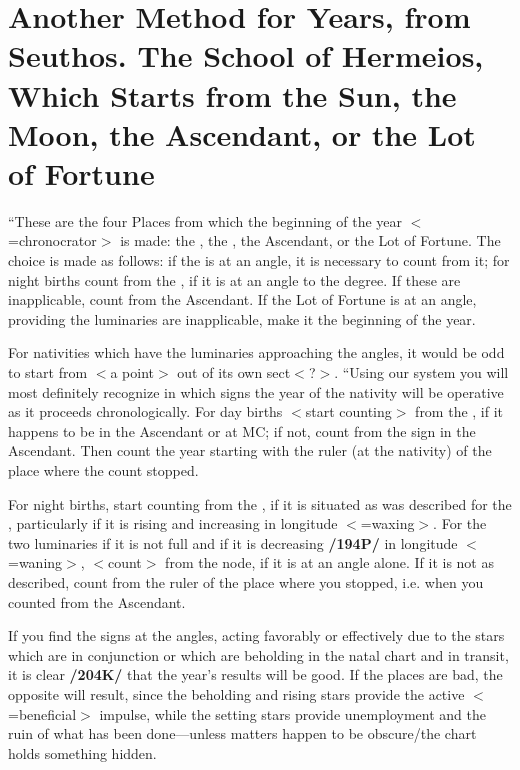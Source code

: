 \section{Another Method for Years, from Seuthos. The School of Hermeios, Which Starts from the Sun, the Moon, the Ascendant, or the Lot of Fortune}

“These are the four Places from which the beginning of the year $<$=chronocrator$>$ is made: the \Sun, the \Moon, the Ascendant, or the Lot of Fortune. The choice is made as follows: if the \Sun\xspace is at an angle, it is necessary to count from it; for night births count from the \Moon, if it is at an angle to the degree. If these are inapplicable, count from the Ascendant. If the Lot of Fortune is at an angle, providing the luminaries are inapplicable, make it the beginning of the year. 

For nativities which have the luminaries approaching the angles, it would be odd to start from $<$a point$>$ out of its own sect$<$?$>$. “Using our system you will most definitely recognize in which signs the year of the nativity will be
operative as it proceeds chronologically. For day births $<$start counting$>$ from the \Sun, if it happens to be
in the Ascendant or at MC; if not, count from the sign in the Ascendant. Then count the year starting with the ruler (at the nativity) of the place where the count stopped. 

For night births, start counting from the \Moon, if it is situated as was described for the \Sun, particularly if it is rising and increasing in longitude $<$=waxing$>$. For the two luminaries if it is not full and if it is decreasing \textbf{/194P/} in longitude $<$=waning$>$, $<$count$>$ from the node, if it is at an angle alone. If it is not as described, count from the ruler of the place where you stopped, i.e. when you counted from the Ascendant. 

If you find the signs at the angles, acting favorably or effectively due to the stars which are in conjunction or which are beholding in the natal chart and in transit, it is clear \textbf{/204K/} that the year’s results will be good. If the places are bad, the opposite will result, since the beholding and rising stars provide the active $<$=beneficial$>$ impulse,
while the setting stars provide unemployment and the ruin of what has been done—unless matters happen to be obscure/the chart holds something hidden.

\newpage